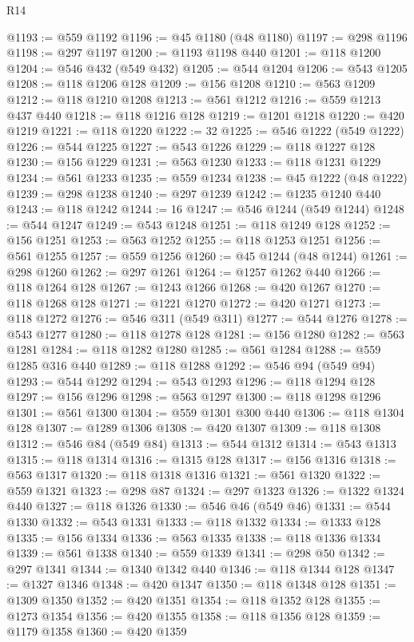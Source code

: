 \begin{lexlean}{R14}
\begin{coremodule}
@1193 := @559 @1192
@1196 := @45 @1180 (@48 @1180)
@1197 := @298 @1196
@1198 := @297 @1197
@1200 := @1193 @1198 @440
@1201 := @118 @1200
@1204 := @546 @432 (@549 @432)
@1205 := @544 @1204
@1206 := @543 @1205
@1208 := @118 @1206 @128
@1209 := @156 @1208
@1210 := @563 @1209
@1212 := @118 @1210 @1208
@1213 := @561 @1212
@1216 := @559 @1213 @437 @440
@1218 := @118 @1216 @128
@1219 := @1201 @1218
@1220 := @420 @1219
@1221 := @118 @1220
@1222 := 32
@1225 := @546 @1222 (@549 @1222)
@1226 := @544 @1225
@1227 := @543 @1226
@1229 := @118 @1227 @128
@1230 := @156 @1229
@1231 := @563 @1230
@1233 := @118 @1231 @1229
@1234 := @561 @1233
@1235 := @559 @1234
@1238 := @45 @1222 (@48 @1222)
@1239 := @298 @1238
@1240 := @297 @1239
@1242 := @1235 @1240 @440
@1243 := @118 @1242
@1244 := 16
@1247 := @546 @1244 (@549 @1244)
@1248 := @544 @1247
@1249 := @543 @1248
@1251 := @118 @1249 @128
@1252 := @156 @1251
@1253 := @563 @1252
@1255 := @118 @1253 @1251
@1256 := @561 @1255
@1257 := @559 @1256
@1260 := @45 @1244 (@48 @1244)
@1261 := @298 @1260
@1262 := @297 @1261
@1264 := @1257 @1262 @440
@1266 := @118 @1264 @128
@1267 := @1243 @1266
@1268 := @420 @1267
@1270 := @118 @1268 @128
@1271 := @1221 @1270
@1272 := @420 @1271
@1273 := @118 @1272
@1276 := @546 @311 (@549 @311)
@1277 := @544 @1276
@1278 := @543 @1277
@1280 := @118 @1278 @128
@1281 := @156 @1280
@1282 := @563 @1281
@1284 := @118 @1282 @1280
@1285 := @561 @1284
@1288 := @559 @1285 @316 @440
@1289 := @118 @1288
@1292 := @546 @94 (@549 @94)
@1293 := @544 @1292
@1294 := @543 @1293
@1296 := @118 @1294 @128
@1297 := @156 @1296
@1298 := @563 @1297
@1300 := @118 @1298 @1296
@1301 := @561 @1300
@1304 := @559 @1301 @300 @440
@1306 := @118 @1304 @128
@1307 := @1289 @1306
@1308 := @420 @1307
@1309 := @118 @1308
@1312 := @546 @84 (@549 @84)
@1313 := @544 @1312
@1314 := @543 @1313
@1315 := @118 @1314
@1316 := @1315 @128
@1317 := @156 @1316
@1318 := @563 @1317
@1320 := @118 @1318 @1316
@1321 := @561 @1320
@1322 := @559 @1321
@1323 := @298 @87
@1324 := @297 @1323
@1326 := @1322 @1324 @440
@1327 := @118 @1326
@1330 := @546 @46 (@549 @46)
@1331 := @544 @1330
@1332 := @543 @1331
@1333 := @118 @1332
@1334 := @1333 @128
@1335 := @156 @1334
@1336 := @563 @1335
@1338 := @118 @1336 @1334
@1339 := @561 @1338
@1340 := @559 @1339
@1341 := @298 @50
@1342 := @297 @1341
@1344 := @1340 @1342 @440
@1346 := @118 @1344 @128
@1347 := @1327 @1346
@1348 := @420 @1347
@1350 := @118 @1348 @128
@1351 := @1309 @1350
@1352 := @420 @1351
@1354 := @118 @1352 @128
@1355 := @1273 @1354
@1356 := @420 @1355
@1358 := @118 @1356 @128
@1359 := @1179 @1358
@1360 := @420 @1359

\end{coremodule}
\end{lexlean}
